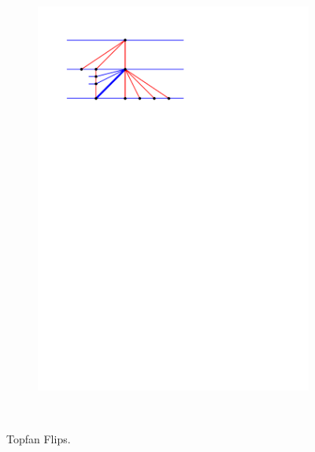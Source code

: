 \begin{figure}[!b]
\begin{subfigure}[t]{0.23 \textwidth}
        \includegraphics[width =\textwidth]{topFanFlips/img/newFlip/bBigAfter}
    \end{subfigure}
    ~
    \caption{Topfan Flips.}
\end{figure}
